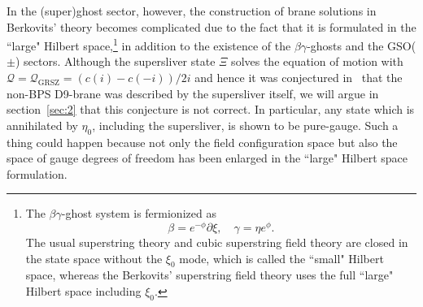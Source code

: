\documentclass[a4paper,12pt]{article}
\newcommand{\cQ}{\mathcal{Q}}
\newcommand{\Qmid}{\cQ_{\mathrm{GRSZ}}}
\begin{document}
In the (super)ghost sector, however, the construction of brane solutions in Berkovits' theory becomes 
complicated due to the fact that it is formulated in the ``large" Hilbert space,\footnote{The 
$\beta\gamma$-ghost system is fermionized as 
\begin{equation}
\beta=e^{-\phi}\partial\xi, \quad \gamma=\eta e^{\phi}. \label{eq:FMS}
\end{equation}
The usual superstring theory and cubic superstring field theory are closed in the state space 
without the $\xi_0$ mode, which is called the ``small" Hilbert space, whereas the Berkovits' 
superstring field theory uses the full ``large" Hilbert space including $\xi_0$.}
in addition to the existence of the $\beta\gamma$-ghosts and the GSO($\pm$) sectors. Although 
the supersliver state $\Xi$ solves the equation of motion with $\cQ=\Qmid=(c(i)-c(-i))/2i$ and 
hence it was conjectured in~\cite{MS} that the non-BPS D9-brane was described by the 
supersliver itself, we will argue in section~\ref{sec:2} that this conjecture is not correct. 
In particular, any state which is annihilated by $\eta_0$, including the supersliver, is shown to 
be pure-gauge. Such a thing could happen because not only the field configuration space but also 
the space of gauge degrees of freedom has been enlarged in the ``large" Hilbert space formulation. 
\smallskip
\end{document}
